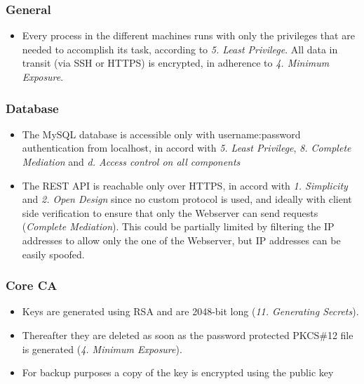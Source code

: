 \documentclass[english]{article}
\begin{document}
\subsubsection{General}
\begin{itemize}
\item Every process in the different machines runs with only the privileges that are needed to accomplish its task, according to \emph{5. Least Privilege}. All data in transit (via SSH or HTTPS) is
encrypted, in adherence to \emph{4. Minimum Exposure}.
\end{itemize}

\subsubsection{Database}
\begin{itemize}
\item The MySQL database is accessible only with username:password authentication from localhost, in accord with \emph{5. Least Privilege}, \emph{8. Complete Mediation} and  \emph{d. Access control on all components}
\item The REST API is reachable only over HTTPS, in accord with \emph{1. Simplicity} and \emph{2. Open Design} since no custom protocol is used, and ideally with client side verification to ensure that only the Webserver
can send requests (\emph{Complete Mediation}). %
This could be partially limited by filtering the IP addresses to allow only the one of the Webserver, but IP addresses can be easily spoofed.
\end{itemize}

\subsubsection{Core CA}
\begin{itemize}
\item Keys are generated using RSA and are 2048-bit long (\emph{11. Generating Secrets}).
\item Thereafter they are deleted as soon as the password protected PKCS\#12 file is generated (\emph{4. Minimum Exposure}).
\item For backup purposes a copy of the key is encrypted using the public key
\end{itemize}
\end{document}
